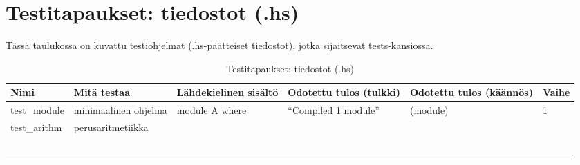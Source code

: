 \documentclass[11pt]{article} %
\begin{document}
\section{Testitapaukset: tiedostot (.hs)}


Tässä taulukossa on kuvattu testiohjelmat (.hs-päätteiset tiedostot), jotka sijaitsevat tests-kansiossa.

\begin{table}[!htbp] %
\caption{Testitapaukset: tiedostot (.hs)}
\begin{tabular}{|p{3cm}|p{3cm}|p{5cm}|p{3cm}|p{3cm}|p{3cm}|}
\hline
\textbf{Nimi} & \textbf{Mitä testaa} & \textbf{Lähdekielinen sisältö} & \textbf{Odotettu tulos (tulkki)} & \textbf{Odotettu tulos (käännös)} & \textbf{Vaihe} \\ \hline
test\_module  &  minimaalinen ohjelma  & module A where &  ``Compiled 1 module''                     &    (module)                 & 1   \\ \hline
 test\_arithm     & perusaritmetiikka         &  &                                  &                                   &                \\ \hline
              &                      &                       &           &                                   &                \\ \hline
              &                      &                       &           &                                   &                \\ \hline
              &                      &                       &           &                                   &                \\ \hline

              &                      &                       &           &                                   &                \\ \hline
              &                      &                       &           &                                   &                \\ \hline
              &                      &                       &           &                                   &                \\ \hline
             
\end{tabular}
\end{table}
\end{document}
